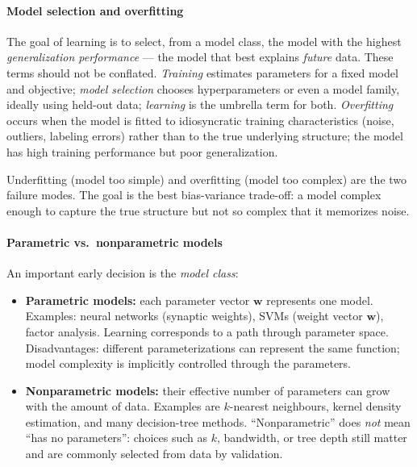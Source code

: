 \documentclass[11pt, oneside]{book}
\newcommand{\wvec}{\bm{w}}
\begin{document}
\paragraph{Model selection and overfitting}
The goal of learning is to select, from a model class, the model with the highest
\emph{generalization performance} --- the model that best explains \emph{future} data.
These terms should not be conflated. \emph{Training} estimates parameters for a fixed
model and objective; \emph{model selection} chooses hyperparameters or even a model
family, ideally using held-out data; \emph{learning} is the umbrella term for both.
\emph{Overfitting} occurs when the model is fitted to idiosyncratic training
characteristics (noise, outliers, labeling errors) rather than to the true underlying
structure; the model has high training performance but poor generalization.

\begin{intbox}
  Underfitting (model too simple) and overfitting (model too complex) are the two
  failure modes. The goal is the best bias-variance trade-off: a model complex enough
  to capture the true structure but not so complex that it memorizes noise.
\end{intbox}

\paragraph{Parametric vs.\ nonparametric models}
An important early decision is the \emph{model class}:

\begin{itemize}
  \item \textbf{Parametric models:} each parameter vector $\wvec$ represents one model.
        Examples: neural networks (synaptic weights), SVMs (weight vector $\wvec$), factor
        analysis. Learning corresponds to a path through parameter space.
        Disadvantages: different parameterizations can represent the same function; model
        complexity is implicitly controlled through the parameters.

  \item \textbf{Nonparametric models:} their effective number of parameters can grow
        with the amount of data. Examples are $k$-nearest neighbours, kernel density
        estimation, and many decision-tree methods. ``Nonparametric'' does \emph{not}
        mean ``has no parameters'': choices such as $k$, bandwidth, or tree depth still
        matter and are commonly selected from data by validation.
\end{itemize}
\end{document}
